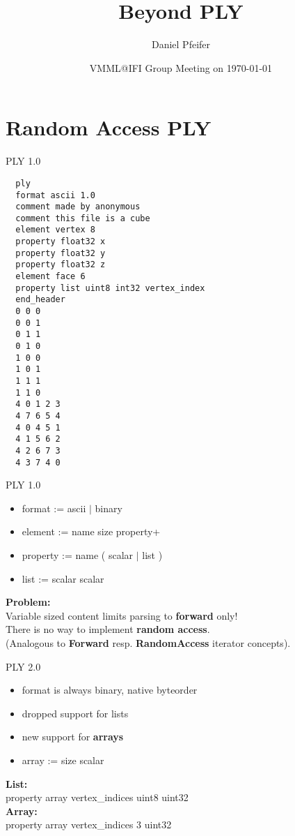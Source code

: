 \documentclass[paper=screen,orient=landscape,style=simple]{powerdot}
\title{Beyond PLY}
\author{Daniel Pfeifer}
\date{VMML@IFI Group Meeting on \today}
\begin{document}
\maketitle

\section{Random Access PLY}

\begin{slide}[method=file]{PLY 1.0}
\linespread{0}
\begin{lstlisting}
  ply
  format ascii 1.0
  comment made by anonymous
  comment this file is a cube
  element vertex 8
  property float32 x
  property float32 y
  property float32 z
  element face 6
  property list uint8 int32 vertex_index
  end_header
  0 0 0
  0 0 1
  0 1 1
  0 1 0
  1 0 0
  1 0 1
  1 1 1
  1 1 0
  4 0 1 2 3
  4 7 6 5 4
  4 0 4 5 1
  4 1 5 6 2
  4 2 6 7 3
  4 3 7 4 0
\end{lstlisting}
\end{slide}

\begin{slide}{PLY 1.0}
  \begin{itemize}
    \item format := ascii $|$ binary
    \item element := name size property+
    \item property := name ( scalar $|$ list )
    \item list := scalar scalar
  \end{itemize}

  \textbf{Problem:}\\
  Variable sized content limits parsing to \textbf{forward} only!\\
  There is no way to implement \textbf{random access}.\\
  (Analogous to \textbf{Forward} resp. \textbf{RandomAccess} iterator concepts).
\end{slide}

\begin{slide}{PLY 2.0}
  \begin{itemize}
    \item format is always binary, native byteorder
    \item dropped support for lists
    \item new support for \textbf{arrays}
    \item array := size scalar
  \end{itemize}

  \textbf{List:}\\
  property array vertex\_indices uint8 uint32\\[2em]

  \textbf{Array:}\\
  property array vertex\_indices 3 uint32
\end{slide}
\end{document}
